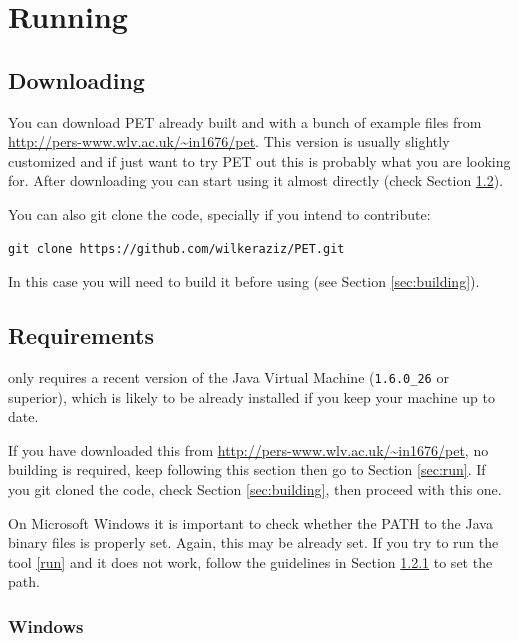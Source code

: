 \chapter{Running}

\section{Downloading}

You can download PET already built and with a bunch of example files from \url{http://pers-www.wlv.ac.uk/~in1676/pet}.
This version is usually slightly customized and if just want to try PET out this is probably what you are looking for. After downloading you can start using it almost directly (check Section \ref{sec:requirements}).

You can also git clone the code, specially if you intend to contribute:

\begin{lstlisting}[style=BashStyle]
git clone https://github.com/wilkeraziz/PET.git
\end{lstlisting}

In this case you will need to build it before using (see Section \ref{sec:building}).

\section{Requirements}\label{sec:requirements}

\PET only requires a recent version of the Java Virtual Machine (\verb!1.6.0_26! or superior), which is likely to be already installed if you keep your machine up to date. 

If you have downloaded this from \url{http://pers-www.wlv.ac.uk/~in1676/pet}, no building is required, keep following this section then go to Section \ref{sec:run}.
If you git cloned the code, check Section \ref{sec:building}, then proceed with this one.

On Microsoft Windows it is important to check whether the PATH to the Java binary files is properly set. Again, this may be already set. If you try to run the tool \ref{run} and it does not work, follow the guidelines in Section \ref{sec:win} to set the path.

\subsection{Windows}\label{sec:win}

